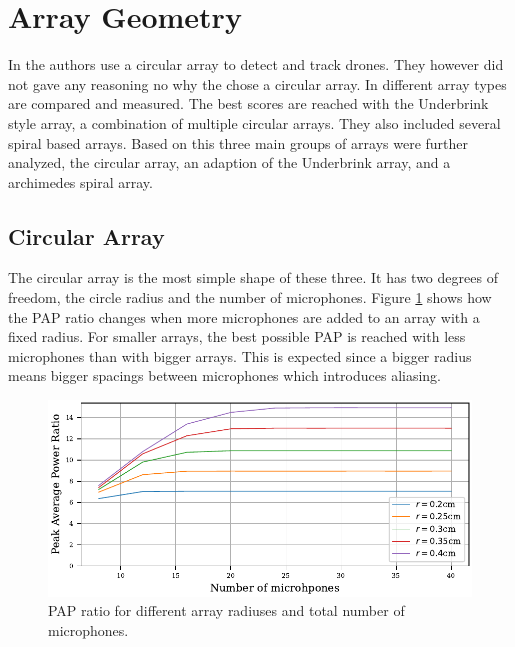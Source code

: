 \section{Array Geometry}
In \cite{GuiAhmad} the authors use a circular array to detect and track drones.
They however did not gave any reasoning no why the chose a circular array.
In \cite{array_comp} different array types are compared and measured.
The best scores are reached with the Underbrink style array, a combination
of multiple circular arrays.
They also included several spiral based arrays.
Based on this three main groups of arrays were further analyzed,
the circular array, an adaption of the Underbrink array, and a archimedes
spiral array.
\subsection{Circular Array}
The circular array is the most simple shape of these three.
It has two degrees of freedom, the circle radius and the number of microphones.
Figure \ref*{aev:fig:MicCirc} shows how the PAP ratio changes when
more microphones are added to an array with a fixed radius.
For smaller arrays, the best possible PAP is reached with less
microphones than with bigger arrays.
This is expected since a bigger radius means bigger spacings between microphones
which introduces aliasing.
\begin{figure}[h]
	\centering
	\includegraphics[]{images/5_array_evaluation/circ_m_pap.pdf}
	\caption{PAP ratio for different array radiuses and total number
		of microphones.}
	\label{aev:fig:MicCirc}
\end{figure}

